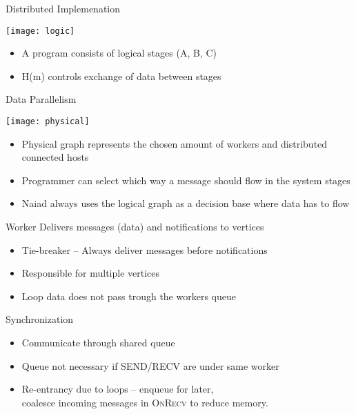\begin{frame}[t]{Distributed Implemenation}
  \vspace{0.6cm}
  \begin{center}
    \texttt{[image: logic]}
  \end{center}
  \begin{itemize}\setlength\itemsep{0.25cm}
    \item A program consists of logical stages (A, B, C)
    \item H(m) controls exchange of data between stages
  \end{itemize}
\end{frame}

\begin{frame}[t]{Data Parallelism}
   \begin{center}
   \texttt{[image: physical]}
   \end{center}
   \begin{itemize}\setlength\itemsep{0.25cm}
     \item Physical graph represents the chosen amount of workers and distributed connected hosts
     \item Programmer can select which way a message should flow in the system
stages
\item Naiad always uses the logical graph as a decision base where data has to flow
    \end{itemize}

\end{frame}

\begin{frame}[t]{Worker}
  \vspace{0.15cm}
  Delivers messages (data) and notifications to vertices

  \begin{itemize}\setlength\itemsep{0.25cm}
    \item Tie-breaker -- Always deliver messages before notifications
    \item Responsible for multiple vertices
    \item Loop data does not pass trough the workers queue
  \end{itemize}

  \pause
  \vspace{0.25cm}
  Synchronization
  \begin{itemize}\setlength\itemsep{0.25cm}
    \item Communicate through shared queue
    \item Queue not necessary if \textsc{SEND/RECV} are under same worker
    \item Re-entrancy due to loops -- enqueue for later, \\
          coalesce incoming messages in \textsc{OnRecv} to reduce memory.
  \end{itemize}

\end{frame}

